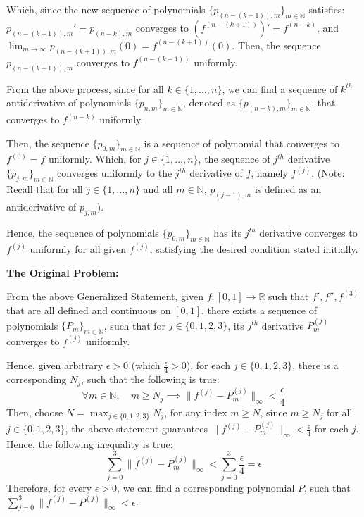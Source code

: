 \documentclass{article}
\begin{document}
Which, since the new sequence of polynomials $\{p_{(n-(k+1)),m}\}_{m\in\mathbb{N}}$ satisfies: $p_{(n-(k+1)),m}'=p_{(n-k),m}$ converges to $(f^{(n-(k+1))})'=f^{(n-k)}$,
and $\lim_{m\rightarrow\infty}p_{(n-(k+1)),m}(0)=f^{(n-(k+1))}(0)$. Then, the sequence $p_{(n-(k+1)),m}$ converges to $f^{(n-(k+1))}$ uniformly.

\hfill

From the above process, since for all $k\in \{1,...,n\}$, we can find a sequence of $k^{th}$ antiderivative of polynomials $\{p_{n,m}\}_{m\in\mathbb{N}}$, denoted as $\{p_{(n-k),m}\}_{m\in\mathbb{N}}$, that converges to $f^{(n-k)}$ uniformly. 

Then, the sequence $\{p_{0,m}\}_{m\in\mathbb{N}}$ is a sequence of polynomial that converges to $f^{(0)}=f$ uniformly. Which, for $j\in\{1,...,n\}$, the sequence of $j^{th}$ derivative $\{p_{j,m}\}_{m\in\mathbb{N}}$ converges uniformly to the $j^{th}$ derivative of $f$, namely $f^{(j)}$.
(Note: Recall that for all $j\in\{1,...,n\}$ and all $m\in\mathbb{N}$, $p_{(j-1),m}$ is defined as an antiderivative of $p_{j,m}$).

Hence, the sequence of polynomials $\{p_{0,m}\}_{m\in\mathbb{N}}$ has its $j^{th}$ derivative converges to $f^{(j)}$ uniformly for all given $f^{(j)}$, satisfying the desired condition stated initially.

\hfill

\textbf{The Original Problem:}

From the above Generalized Statement, given $f:[0,1]\rightarrow\mathbb{R}$ such that $f',f'',f^{(3)}$ that are all defined and continuous on $[0,1]$, there exists a sequence of polynomials $\{P_m\}_{m\in\mathbb{N}}$, 
such that for $j\in\{0,1,2,3\}$, its $j^{th}$ derivative $P_m^{(j)}$ converges to $f^{(j)}$ uniformly.

Hence, given arbitrary $\epsilon>0$ (which $\frac{\epsilon}{4}>0$), for each $j\in\{0,1,2,3\}$, there is a corresponding $N_j$, such that the following is true:
$$\forall m\in\mathbb{N},\quad m\geq N_j \implies \|f^{(j)}-P_m^{(j)}\|_\infty <\frac{\epsilon}{4}$$
Then, choose $N = \max_{j\in\{0,1,2,3\}}N_j$, for any index $m\geq N$, since $m\geq N_j$ for all $j\in\{0,1,2,3\}$, the above statement guarantees $\|f^{(j)}-P_m^{(j)}\|_\infty <\frac{\epsilon}{4}$ for each $j$.
Hence, the following inequality is true:
$$\sum_{j=0}^{3}\|f^{(j)}-P_m^{(j)}\|_\infty < \sum_{j=0}^{3}\frac{\epsilon}{4}=\epsilon$$
Therefore, for every $\epsilon>0$, we can find a corresponding polynomial $P$, such that $\sum_{j=0}^{3}\|f^{(j)}-P^{(j)}\|_\infty<\epsilon$.
\end{document}

